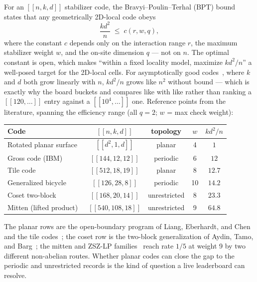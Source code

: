 \documentclass[11pt]{article}
\newcommand{\eff}{kd^2/n}
\begin{document}
	For an $[[n,k,d]]$ stabilizer code, the Bravyi--Poulin--Terhal (BPT) bound~\cite{bravyi2010tradeoffs}
	states that any geometrically 2D-local code obeys
	\begin{equation}
		\frac{kd^2}{n} \;\le\; c(r,w,q),
		\label{eq:bpt}
	\end{equation}
	where the constant $c$ depends only on the interaction range $r$, the
	maximum stabilizer weight $w$, and the on-site dimension $q$ --- not on
	$n$. The optimal constant is open, which makes ``within a fixed locality
	model, maximize $\eff$'' a well-posed target for the 2D-local cells. For
	asymptotically good codes~\cite{panteleev2022asymptotically,tillich2014quantum}, where $k$ and $d$ both grow linearly with $n$,
	$\eff$ grows like $n^2$ without bound --- which is exactly why the board
	buckets and compares like with like rather than ranking a
	$[[120,\dots]]$ entry against a $[[10^4,\dots]]$ one. Reference points
	from the literature, spanning the efficiency range (all $q=2$; $w$ = max
	check weight):
	\begin{center}
		\begin{tabular}{lcccc}
			\toprule
			Code & $[[n,k,d]]$ & topology & $w$ & $\eff$\\
			\midrule
			Rotated planar surface~\cite{kitaev2003fault} & $[[d^2,1,d]]$ & planar & 4  & $1$\\
			Gross code (IBM)~\cite{bravyi2024high} & $[[144,12,12]]$ & periodic & 6  & $12$\\
			Tile code~\cite{steffan2025tile} & $[[512,18,19]]$ & planar & 8  & $12.7$\\
			Generalized bicycle~\cite{panteleev2021degenerate} & $[[126,28,8]]$ & periodic & 10 & $14.2$\\
			Coset two-block~\cite{aydin2026breaking} & $[[168,20,14]]$ & unrestricted & 8  & $23.3$\\
			Mitten (lifted product)~\cite{bhardwaj2026mitten} & $[[540,108,18]]$ & unrestricted & 9 & $64.8$\\
			\bottomrule
		\end{tabular}
	\end{center}
	The planar rows are the open-boundary program of Liang, Eberhardt, and
	Chen~\cite{liang2025planar} and the tile codes~\cite{steffan2025tile};
	the coset row is the two-block generalization of Aydin, Tamo, and
	Barg~\cite{aydin2026breaking}; the mitten and ZSZ-LP
	families~\cite{bhardwaj2026mitten,hong2026zszlp} reach rate $1/5$ at
	weight 9 by two different non-abelian routes. Whether planar codes can
	close the gap to the periodic and unrestricted records is the kind of
	question a live leaderboard can resolve.
\end{document}
